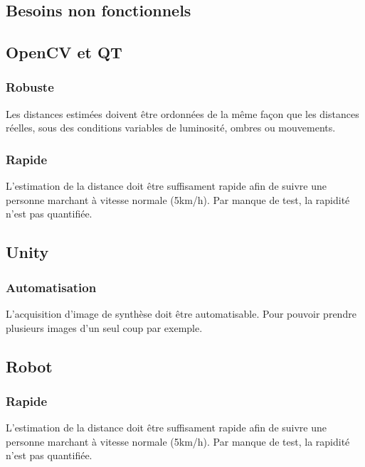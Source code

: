\documentclass[a4paper]{article}
\begin{document}
\subsection{Besoins non fonctionnels}

\subsection*{OpenCV et QT}

\subsubsection*{Robuste}

Les distances estimées doivent être ordonnées de la même façon que les distances
réelles, sous des conditions variables de luminosité, ombres ou mouvements.

\subsubsection*{Rapide}

L'estimation de la distance doit être suffisament rapide afin de suivre une personne
marchant à vitesse normale (5km/h). Par manque de test, la rapidité n'est pas quantifiée.

\subsection*{Unity}

\subsubsection*{Automatisation}

L'acquisition d'image de synthèse doit être automatisable. Pour pouvoir prendre
plusieurs images d'un seul coup par exemple.

\subsection*{Robot}

\subsubsection*{Rapide}

L'estimation de la distance doit être suffisament rapide afin de suivre une personne
marchant à vitesse normale (5km/h). Par manque de test, la rapidité n'est pas quantifiée.
\end{document}
